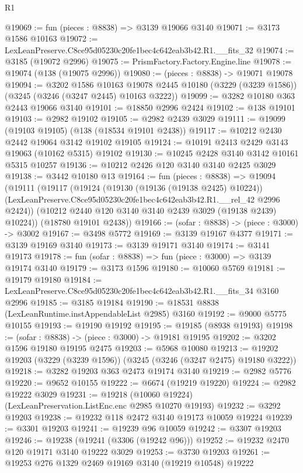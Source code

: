 \begin{lexlean}{R1}
\begin{coremodule}
@19069 := fun (pieces : @8838) => @3139 @19066 @3140
@19071 := @3173 @1586 @10163
@19072 := LexLeanPreserve.C8ce95d05230c20fe1bec4c642eab3b42.R1.__fits_32
@19074 := @3185 (@19072 @2996)
@19075 := PrismFactory.Factory.Engine.line
@19078 := @19074 (@138 (@19075 @2996))
@19080 := (pieces : @8838) -> @19071 @19078
@19094 := @3202
    @1586
    @10163
    @19078
    @2445
    @10180
    (@3229 (@3239 @1586))
    (@3245 (@3246 (@3247 @2445) @10163 @3222))
@19099 := @3282 @10180 @363 @2443 @19066 @3140
@19101 := @18850 @2996 @2424
@19102 := @138 @19101
@19103 := @2982 @19102
@19105 := @2982 @2439 @3029
@19111 := @19099 (@19103 @19105) (@138 (@18534 @19101 @2438))
@19117 := @10212 @2430 @2442 @19064 @3142 @19102 @19105
@19124 := @10191 @2413 @2429 @3143 @19063 (@10162 @5315) @19102
@19130 := @10245 @2428 @3140 @3142 @10161 @5315 @10257
@19136 := @10212 @2426 @120 @3140 @3140 @2425 @3029
@19138 := @3442 @10180 @13
@19164 := fun (pieces : @8838) =>
  @19094
    (@19111
      (@19117
        (@19124
          (@19130 (@19136 (@19138 @2425) @10224))
          (LexLeanPreserve.C8ce95d05230c20fe1bec4c642eab3b42.R1.__rel_42 @2996 @2424))
        (@10212 @2440 @120 @3140 @3140 @2439 @3029 (@19138 @2439) @10224))
      (@18780 @19101 @2438))
@19166 := (sofar : @8838) -> (piece : @3000) -> @3002
@19167 := @3498 @5772
@19169 := @3139 @19167 @4377
@19171 := @3139 @19169 @3140
@19173 := @3139 @19171 @3140
@19174 := @3141 @19173
@19178 := fun (sofar : @8838) => fun (piece : @3000) => @3139 @19174 @3140
@19179 := @3173 @1596
@19180 := @10060 @5769
@19181 := @19179 @19180
@19184 := LexLeanPreserve.C8ce95d05230c20fe1bec4c642eab3b42.R1.__fits_34 @3160 @2996
@19185 := @3185 @19184
@19190 := @18531 @8838 (LexLeanRuntime.instAppendableList @2985) @3160
@19192 := @9000 @5775 @10155
@19193 := @19190 @19192
@19195 := @19185 (@8938 @19193)
@19198 := (sofar : @8838) -> (piece : @3000) -> @19181 @19195
@19202 := @3202 @1596 @19180 @19195 @2475
@19203 := @5968 @10080
@19213 := @19202 @19203 (@3229 (@3239 @1596)) (@3245 (@3246 (@3247 @2475) @19180 @3222))
@19218 := @3282 @19203 @363 @2473 @19174 @3140
@19219 := @2982 @5776
@19220 := @9652 @10155
@19222 := @6674 (@19219 @19220)
@19224 := @2982 @19222 @3029
@19231 := @19218 (@10060 @19224) (LexLeanPreservation.ListEnc.enc @2985 @10270 @19193)
@19232 := @3292 @19203
@19238 := @19232 @118 @2472 @3140 @19173 @10059 @19224
@19239 := @3301 @19203
@19241 := @19239 @96 @10059
@19242 := @3307 @19203
@19246 := @19238 (@19241 (@3306 (@19242 @96)))
@19252 := @19232 @2470 @120 @19171 @3140 @19222 @3029
@19253 := @3730 @19203
@19261 := @19253 @276 @1329 @2469 @19169 @3140 (@19219 @10548) @19222

\end{coremodule}
\end{lexlean}
